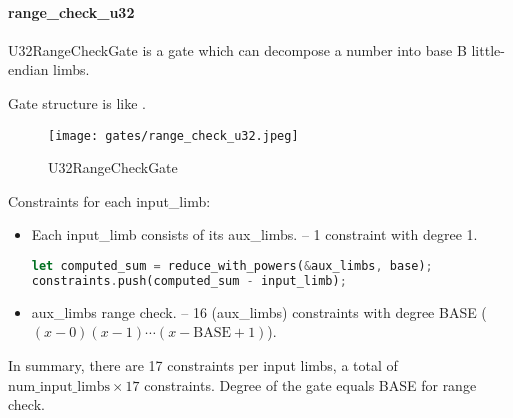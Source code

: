 \paragraph{range\_check\_u32}

U32RangeCheckGate is a gate which can decompose a number into base B little-endian limbs.

Gate structure is like .

\begin{figure}[!ht]
    \centering
    \texttt{[image: gates/range\_check\_u32.jpeg]}
    \caption{U32RangeCheckGate}
    \label{fig:range-check-u32}
\end{figure}

Constraints for each input\_limb:
\begin{itemize}
    \item Each input\_limb consists of its aux\_limbs. -- 1 constraint with degree 1.
    \begin{lstlisting}[language=rust]
let computed_sum = reduce_with_powers(&aux_limbs, base);
constraints.push(computed_sum - input_limb);
    \end{lstlisting}
    \item aux\_limbs range check. -- 16 (aux\_limbs) constraints with degree BASE ($(x-0)(x-1)\cdots(x-\text{BASE}+1)$).
\end{itemize}

In summary, there are 17 constraints per input limbs, a total of $\text{num\_input\_limbs} \times 17$ constraints. 
Degree of the gate equals BASE for range check.

